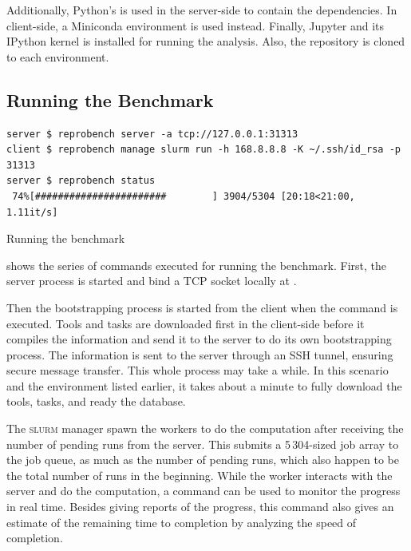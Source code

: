Additionally, Python's  is used in the server-side to contain the dependencies.
In client-side, a Miniconda environment is used instead.
Finally, Jupyter and its IPython kernel is installed for running the analysis.
Also, the repository is cloned to each environment.

\subsection{Running the Benchmark}

\begin{listing}
	\begin{verbatim}
server $ reprobench server -a tcp://127.0.0.1:31313
client $ reprobench manage slurm run -h 168.8.8.8 -K ~/.ssh/id_rsa -p 31313
server $ reprobench status
 74%[#######################        ] 3904/5304 [20:18<21:00,  1.11it/s]
    \end{verbatim}
	\caption{Running the benchmark}
	\label{lst:eval.running}
\end{listing}

 shows the series of commands executed for running the benchmark.
First, the server process is started and bind a TCP socket locally at .

Then the bootstrapping process is started from the client when the  command is executed.
Tools and tasks are downloaded first in the client-side before it compiles the information and send it to the server to do its own bootstrapping process.
The information is sent to the server through an SSH tunnel, ensuring secure message transfer.
This whole process may take a while.
In this scenario and the environment listed earlier, it takes about a minute to fully download the tools, tasks, and ready the database.

The \textsc{slurm} manager spawn the workers to do the computation after receiving the number of pending runs from the server.
This submits a 5\,304-sized job array to the job queue, as much as the number of pending runs, which also happen to be the total number of runs in the beginning.
While the worker interacts with the server and do the computation, a  command can be used to monitor the progress in real time.
Besides giving reports of the progress, this command also gives an estimate of the remaining time to completion by analyzing the speed of completion.

